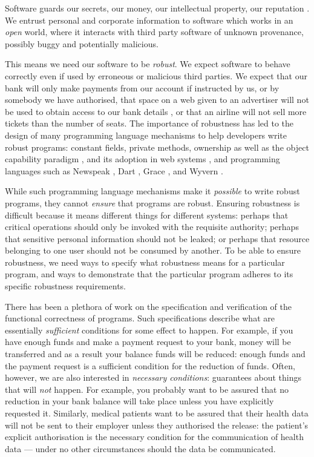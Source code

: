 Software guards our secrets, our money, our intellectual property,
our reputation \cite{covern}.  We entrust personal and
corporate information to software which works in an \emph{open} world, 
where  it interacts with 
third party software of unknown provenance, possibly buggy and potentially malicious.

This means we need our software to be \emph{robust}.
We expect software to behave correctly even if  used 
by erroneous or malicious third parties.
 We expect that our bank will only make payments 
from our account if instructed by us, or by somebody we have authorised, 
that space on a web given to an advertiser will not be used
to obtain access to our bank details \cite{cwe}, or that an
airline will not sell more tickets than the number of seats.
The importance of robustness has led to the design of many programming
language mechanisms to help developers write robust programs:
constant fields, private methods, ownership \cite{ownalias}
as well as the object capability paradigm \cite{MillerPhD},
and its adoption in  web systems
\cite{CapJavaHayesAPLAS17,CapNetSocc17Eide,DOCaT14}, and programming languages such as Newspeak
\cite{newspeak17}, Dart \cite{dart15},
Grace \cite{grace,graceClasses}, and Wyvern \cite{wyverncapabilities}.

While such programming language mechanisms make it \textit{possible} to write robust
programs, they cannot \textit{ensure} that programs are robust.
Ensuring robustness is difficult because it means 
different things for different systems: perhaps
that critical operations should only be invoked with the requisite authority;
perhaps that sensitive personal information should not be leaked; 
or perhaps that resource belonging to one user should not be consumed by another.
%
To be able to ensure robustness, we need ways to specify what robustness means for a 
particular program, and ways to demonstrate that the particular program 
adheres to its specific robustness requirements.

There has been a plethora of work on the specification and verification of the
functional correctness of programs. Such specifications describe what are
essentially \emph{sufficient} conditions for some
effect to happen. For example, if you have enough funds and make a payment request to your bank, money will be transferred
and as a result your balance funds will be reduced: enough funds and the payment request is a sufficient condition for the
reduction of funds.
Often, however, we are also interested in \emph{necessary conditions}:
guarantees about things that will  \emph{not} happen.
%
For example, you  probably 
want to be assured that no reduction in your bank balance will take place unless you have
explicitly requested it. Similarly, medical patients want  to be assured  that   their health data will not be sent to  their employer  
unless they authorised the release:
the patient's explicit authorisation is the
necessary condition for the communication of health data --- under no
other circumstances should the data be communicated.

